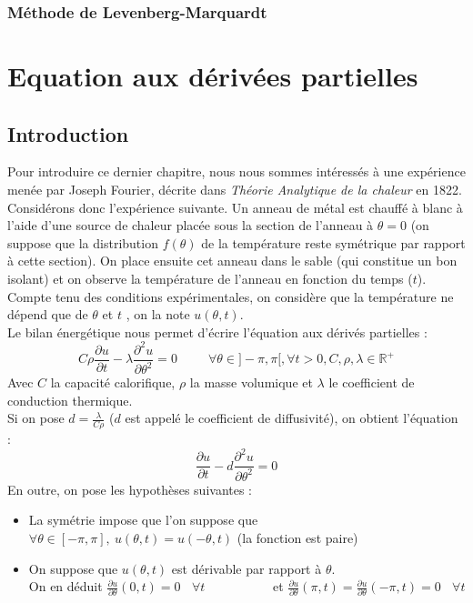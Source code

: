 \documentclass[a4paper,10pt]{report}
\begin{document}
\subsection{Méthode de Levenberg-Marquardt}

\chapter{Equation aux dérivées partielles}
\section{Introduction}
Pour introduire ce dernier chapitre, nous nous sommes intéressés à une expérience menée par Joseph Fourier, décrite dans \textit{Théorie Analytique de la chaleur} en 1822. \\
\indent Considérons donc l'expérience suivante. Un anneau de métal est chauffé à blanc à l'aide d'une source de chaleur placée sous la section de l'anneau à $\theta=0$ (on suppose que la distribution $f(\theta)$ de la température reste symétrique par rapport à cette section). On place ensuite cet anneau dans le sable (qui constitue un bon isolant) et on observe la température de l'anneau en fonction du temps ($t$). Compte tenu des conditions expérimentales, on considère que la température ne dépend que de $\theta$ et $t$ , on la note $u(\theta,t)$. \\
\indent Le bilan énergétique nous permet d'écrire l'équation aux dérivés partielles :
\abovedisplayskip=0mm
\begin{displaymath}
\textit{C}\rho \frac{\partial u}{\partial t} - \lambda \frac{\partial^2u}{\partial\theta^2} = 0 \ \ \ \ \ \ \ \ \ \ \ \forall \theta \in ]-\pi , \pi [, \forall t>0, C, \rho, \lambda \in \mathbb{R}^+
\end{displaymath}
Avec $\textit{C}$ la capacité calorifique, $\rho$ la masse volumique et $\lambda$ le coefficient de conduction thermique.\\
Si on pose $d=\frac{\lambda}{\textit{C}\rho}$ ($d$ est appelé le coefficient de diffusivité), on obtient l'équation :
\begin{equation}
\label{eq_chaleur}
\frac{\partial u}{\partial t} - d \frac{\partial^2 u}{\partial \theta^2} = 0
\end{equation}
En outre, on pose les hypothèses suivantes :
\begin{itemize}
\item La symétrie impose que l'on suppose que $\forall \theta \in [-\pi,\pi], \ u(\theta,t)=u(-\theta,t)$ (la fonction est paire)
\item On suppose que $u(\theta,t)$ est dérivable par rapport à $\theta$. \\
On en déduit $\frac{\partial u}{\partial \theta}(0,t)=0 \ \ \ \ \forall t$
\ \ \ \ \ \ \ \ \ \ et $\frac{\partial u}{\partial \theta}(\pi,t)=\frac{\partial u}{\partial \theta}(-\pi,t)=0 \ \ \ \ \forall t$
\end{itemize}
\end{document}
